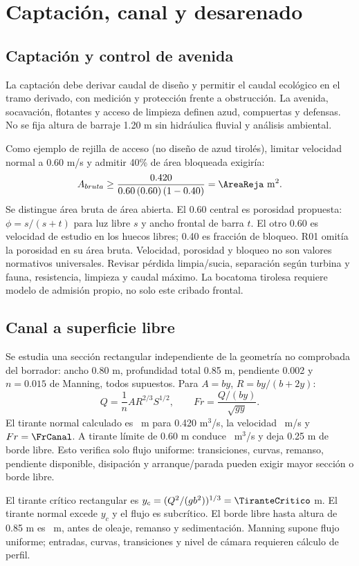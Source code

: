 \section{Captación, canal y desarenado}
\subsection{Captación y control de avenida}
La captación debe derivar caudal de diseño y permitir el caudal ecológico en el tramo derivado, con medición y protección frente a obstrucción. La avenida, socavación, flotantes y acceso de limpieza definen azud, compuertas y defensas. No se fija altura de barraje 1.20 m sin hidráulica fluvial y análisis ambiental.

Como ejemplo de rejilla de acceso (no diseño de azud tirolés), limitar velocidad normal a 0.60 m/s y admitir 40\% de área bloqueada exigiría:
\[
A_{bruta}\geq\frac{0.420}{0.60\,(0.60)\,(1-0.40)}=\AreaReja\ \mathrm{m^2}.
\]
Se distingue área bruta de área abierta. El 0.60 central es porosidad propuesta: $\phi=s/(s+t)$ para luz libre $s$ y ancho frontal de barra $t$. El otro 0.60 es velocidad de estudio en los huecos libres; 0.40 es fracción de bloqueo. R01 omitía la porosidad en su área bruta. Velocidad, porosidad y bloqueo no son valores normativos universales. Revisar pérdida limpia/sucia, separación según turbina y fauna, resistencia, limpieza y caudal máximo. La bocatoma tirolesa requiere modelo de admisión propio, no solo este cribado frontal.

\subsection{Canal a superficie libre}
Se estudia una sección rectangular independiente de la geometría no comprobada del borrador: ancho 0.80 m, profundidad total 0.85 m, pendiente 0.002 y $n=0.015$ de Manning, todos supuestos. Para $A=by$, $R=by/(b+2y)$:
\[
Q=\frac{1}{n}AR^{2/3}S^{1/2},\qquad Fr=\frac{Q/(by)}{\sqrt{gy}}.
\]
El tirante normal calculado es \Tirante\ m para 0.420 m$^3$/s, la velocidad \VCanal\ m/s y $Fr=\FrCanal$. A tirante límite de 0.60 m conduce \QCanal\ m$^3$/s y deja 0.25 m de borde libre. Esto verifica solo flujo uniforme: transiciones, curvas, remanso, pendiente disponible, disipación y arranque/parada pueden exigir mayor sección o borde libre.

El tirante crítico rectangular es $y_c=(Q^2/(gb^2))^{1/3}=\TiranteCritico$ m. El tirante normal excede $y_c$ y el flujo es subcrítico. El borde libre hasta altura de 0.85 m es \BordeLibre\ m, antes de oleaje, remanso y sedimentación. Manning supone flujo uniforme; entradas, curvas, transiciones y nivel de cámara requieren cálculo de perfil.


